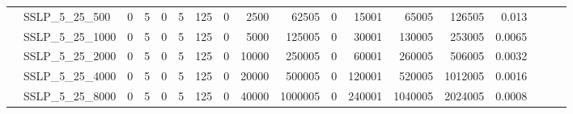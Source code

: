 \begin{landscape}
\begin{longtable}[c]{llrrrrrrrrrrrrrlll}
		& SSLP\_5\_25\_500             & 0                           & 5                          & 0                          & 5                           & 125                        & 0                          & 2500                       & 62505                     & 0                         & 15001                      & 65005                      & 126505                         & 0.013                         &                          &                          &                          \\
		& SSLP\_5\_25\_1000            & 0                           & 5                          & 0                          & 5                           & 125                        & 0                          & 5000                       & 125005                    & 0                         & 30001                      & 130005                     & 253005                         & 0.0065                        &                          &                          &                          \\
		& SSLP\_5\_25\_2000            & 0                           & 5                          & 0                          & 5                           & 125                        & 0                          & 10000                      & 250005                    & 0                         & 60001                      & 260005                     & 506005                         & 0.0032                        &                          &                          &                          \\
		& SSLP\_5\_25\_4000            & 0                           & 5                          & 0                          & 5                           & 125                        & 0                          & 20000                      & 500005                    & 0                         & 120001                     & 520005                     & 1012005                        & 0.0016                        &                          &                          &                          \\
		& SSLP\_5\_25\_8000            & 0                           & 5                          & 0                          & 5                           & 125                        & 0                          & 40000                      & 1000005                   & 0                         & 240001                     & 1040005                    & 2024005                        & 0.0008                        &                          &                          &                          \\

\end{longtable}
\end{landscape}
